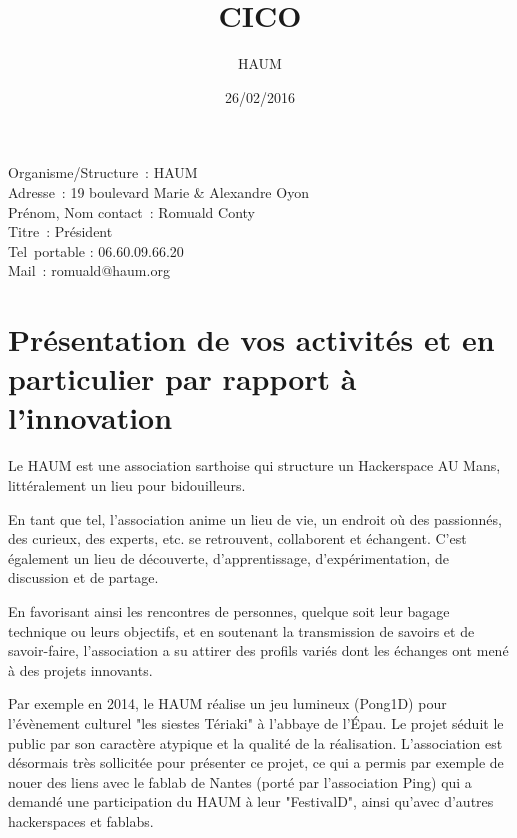 \documentclass[a4paper,10pt]{scrartcl}
\title{CICO}
\author{HAUM}
\date{26/02/2016}
\begin{document}
\maketitle

\hfill
{}

\begin{minipage}{10cm}
Organisme/Structure : HAUM\\
Adresse : 19 boulevard Marie \& Alexandre Oyon\\
Prénom, Nom contact : Romuald Conty\\
Titre : Président\\
Tel portable : 06.60.09.66.20\\
Mail : romuald@haum.org\\
\end{minipage}


\section{Présentation de vos activités et en particulier par rapport à l’innovation}

Le HAUM est une association sarthoise qui structure un Hackerspace AU Mans, littéralement un lieu pour bidouilleurs.

En tant que tel, l'association anime un lieu de vie, un endroit où des passionnés, des curieux, des experts, etc. se retrouvent, collaborent et échangent. C'est également un lieu de découverte, d'apprentissage, d'expérimentation, de discussion et de partage.

En favorisant ainsi les rencontres de personnes, quelque soit leur bagage technique ou leurs objectifs, et en soutenant la transmission de savoirs et de savoir-faire, l'association a su attirer des profils variés dont les échanges ont mené à des projets innovants.

Par exemple en 2014, le HAUM réalise un jeu lumineux (Pong1D) pour l'évènement culturel "les siestes Tériaki" à l'abbaye de l'Épau. Le projet séduit le public par son caractère atypique et la qualité de la réalisation. L'association est désormais très sollicitée pour présenter ce projet, ce qui a permis par exemple de nouer des liens avec le fablab de Nantes (porté par l'association Ping) qui a demandé une participation du HAUM à leur "FestivalD", ainsi qu'avec d'autres hackerspaces et fablabs.
\end{document}
